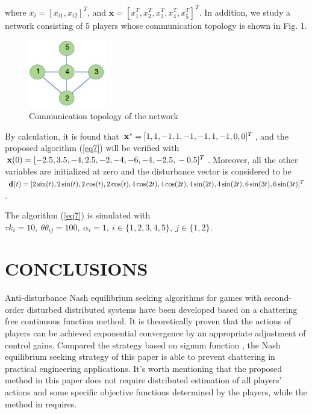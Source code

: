 \documentclass[lettersize,journal]{IEEEtran}
\begin{document}
where $x_i = [x_{i1}, x_{i2}]^T$, and $\mathbf{x}=[x_1^T,x_2^T,x_3^T,x_4^T,x_5^T]^T$. In addition, we study a network consisting of $5$ players whose communication topology is shown in Fig. 1.
\begin{figure}[htbp]
    \centering
    \includegraphics[width=0.3\textwidth]{img/fig1.png}
    \caption{Communication topology of the network}
\end{figure}

By calculation, it is found that $\mathbf{x}^* = [1,1,-1,1,-1,-1,\\1,-1,0,0]^T$, and the proposed algorithm (\ref{eq7}) will be verified with $\mathbf{x}(0) = [-2.5,3.5,-4,2.5,-2,-4,-6,-4,-2.5,\\-0.5]^T$. Moreover, all the other variables are initialized at zero and the disturbance vector is considered to be $\mathbf{d}(t)=[2\sin(t),2\sin(t),2\cos(t),2\cos(t),4\cos(2t),4\cos(2t),\\4\sin(2t),4\sin(2t),6\sin(3t),6\sin(3t)]^T$.

The algorithm (\ref{eq7}) is simulated with $\tau k_i = 10,~\theta\overline{\theta}_{ij}=100,~\alpha_i = 1,~i\in \{1,2,3,4,5\},~j\in \{1,2\}$.
\section{CONCLUSIONS}
Anti-disturbance Nash equilibrium seeking algorithms for games with second-order disturbed distributed systems have been developed based on a chattering free continuous function method. It is theoretically proven that the actions of players can be achieved exponential convergence by an appropriate adjustment of control gains. Compared the strategy based on signum function \cite{9696299}, the Nash equilibrium seeking strategy of this paper is able to prevent chattering in practical engineering applications. It's worth mentioning that the proposed method in this paper does not require distributed estimation of all players' actions and some specific objective functions determined by the players, while the method in \cite{8985536} requires.



\end{document}

